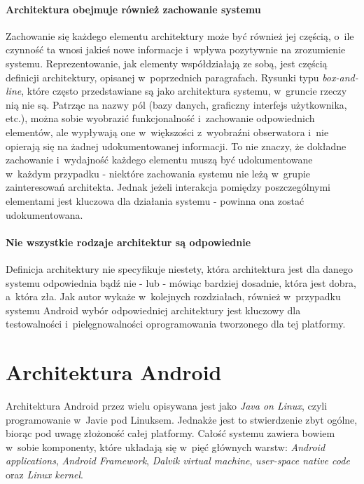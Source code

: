 \paragraph{Architektura obejmuje również zachowanie systemu}
Zachowanie się każdego elementu architektury może być również jej częścią, o~ile czynność ta wnosi jakieś nowe informacje i~wpływa pozytywnie na zrozumienie systemu. Reprezentowanie, jak elementy współdziałają ze sobą, jest częścią definicji architektury, opisanej w~poprzednich paragrafach. Rysunki typu \textit{box-and-line}, które często przedstawiane są jako architektura systemu, w~gruncie rzeczy nią nie są. Patrząc na nazwy pól (bazy danych, graficzny interfejs użytkownika, etc.), można sobie wyobrazić funkcjonalność i~zachowanie odpowiednich elementów, ale wypływają one w~większości z~wyobraźni obserwatora i~nie opierają się na żadnej udokumentowanej informacji. To nie znaczy, że dokładne zachowanie i~wydajność każdego elementu muszą być udokumentowane w~każdym przypadku - niektóre zachowania systemu nie leżą w~grupie zainteresowań architekta. Jednak jeżeli interakcja pomiędzy poszczególnymi elementami jest kluczowa dla działania systemu - powinna ona zostać udokumentowana.

\paragraph{Nie wszystkie rodzaje architektur są odpowiednie}
Definicja architektury nie specyfikuje niestety, która architektura jest dla danego systemu odpowiednia bądź nie - lub - mówiąc bardziej dosadnie, która jest dobra, a~która zła. Jak autor wykaże w~kolejnych rozdziałach, również w~przypadku systemu Android wybór odpowiedniej architektury jest kluczowy dla testowalności i~pielęgnowalności  oprogramowania tworzonego dla tej platformy.

\section{Architektura Android}
Architektura Android przez wielu opisywana jest jako \textit{Java on Linux}, czyli programowanie w~Javie pod Linuksem. Jednakże jest to stwierdzenie zbyt ogólne, biorąc pod uwagę złożoność całej platformy. Całość systemu zawiera bowiem w~sobie komponenty, które układają się w~pięć głównych warstw: \textit{Android applications}, \textit{Android Framework}, \textit{Dalvik virtual machine}, \textit{user-space native code} oraz \textit{Linux kernel}\cite{bib:hacker:handbook}.


